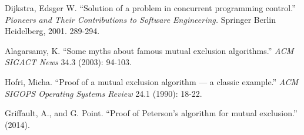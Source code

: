 \documentclass[a4paper,onecolumn,oneside]{article}
\begin{document}
\begin{thebibliography}{32}

 Dijkstra, Edsger W. ``Solution of a problem in concurrent
programming control.'' \emph{Pioneers and Their Contributions to Software
Engineering.} Springer Berlin Heidelberg, 2001. 289-294.

 Alagarsamy, K. ``Some myths about famous mutual
exclusion algorithms.'' \emph{ACM SIGACT News} 34.3 (2003): 94-103.

 Hofri, Micha. ``Proof of a mutual exclusion algorithm --- a
classic example.'' \emph{ACM SIGOPS Operating Systems Review} 24.1 (1990):
18-22.

 Griffault, A., and G. Point. ``Proof of Peterson’s
algorithm for mutual exclusion.'' (2014).

\end{thebibliography}
\end{document}
